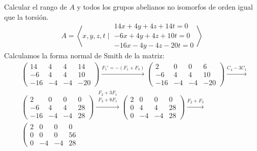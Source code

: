 \begin{ejemplo}
    Calcular el rango de $A$ y todos los grupos abelianos no isomorfos de orden igual que la torsión.
    \begin{equation*}
        A = \left\langle x,y,z,t \mid \begin{array}{c}
            14x + 4y + 4z + 14t = 0 \\
            -6x + 4y + 4z + 10t = 0 \\
            -16x -4y -4z -20t = 0
        \end{array}\right\rangle 
    \end{equation*}
    Calculamos la forma normal de Smith de la matriz:
    \begin{align*}
        &\left(\begin{array}{cccc}
            14 & 4 & 4 & 14 \\
            -6 & 4 & 4 & 10 \\
            -16 & -4 & -4 & -20 
        \end{array}\right) 
        \stackrel{F_1' = -(F_1 + F_3)}{\longrightarrow}
        \left(\begin{array}{cccc}
            2 & 0 & 0 & 6 \\
            -6 & 4 & 4 & 10 \\
            -16 & -4 & -4 & -20 
        \end{array}\right)  
        \stackrel{C_4 - 3C_1}{\longrightarrow} \\
        &\left(\begin{array}{cccc}
            2 & 0 & 0 & 0 \\
            -6 & 4 & 4 & 28 \\
            -16 & -4 & -4 & 28
        \end{array}\right) 
        \stackrel{\substack{F_2 + 3F_1\\F_3 + 8F_1}}{\longrightarrow}
        \left(\begin{array}{cccc}
            2 & 0 & 0 & 0 \\
            0 & 4 & 4 & 28 \\
            0 & -4 & -4 & 28
        \end{array}\right)  
        \stackrel{F_2 + F_3}{\longrightarrow} \\
        &\left(\begin{array}{cccc}
            2 & 0 & 0 & 0 \\
            0 & 0 & 0 & 56 \\
            0 & -4 & -4 & 28

\end{array}
\end{align*}
\end{ejemplo}
